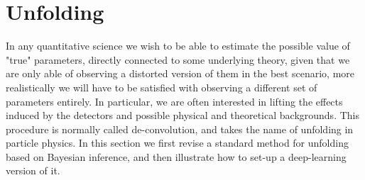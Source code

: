 \section{Unfolding}

In any quantitative science we wish to be able to estimate the possible value of "true" parameters, directly connected to some underlying theory, given that we are only able of observing a distorted version of them in the best scenario, more realistically we will have to be satisfied with observing a different set of parameters entirely.
In particular, we are often interested in lifting the effects induced by the detectors and possible physical and theoretical backgrounds. This procedure is normally called de-convolution, and takes the name of unfolding in particle physics. In this section we first revise a standard method for unfolding based on Bayesian inference, and then illustrate how to set-up a deep-learning version of it.

